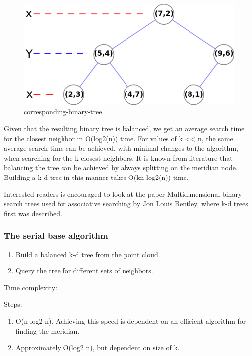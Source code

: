\begin{figure}[ht!]
\centering
\includegraphics[width=120mm]{../gfx/Tree_0001.png}

\caption{corresponding-binary-tree}
\label{fig:tree_0001}
\end{figure}

Given that the resulting binary tree is balanced, we get an average search time for the closest neighbor in O(log2(n)) time. For values of k << n, the same average search time can be achieved, with minimal changes to the algorithm, when searching for the k closest neighbors. It is known from literature that balancing the tree can be achieved by always splitting on the meridian node. Building a k-d tree in this manner takes O(kn log2(n)) time.

Interested readers is encouraged to look at the paper Multidimensional binary search trees used for associative searching by Jon Louis Bentley, where k-d trees first was described.

\subsubsection{The serial base algorithm} %
\label{ssub:the_serial_base_algorithm}

\begin{enumerate}
    \item Build a balanced k-d tree from the point cloud.
    \item Query the tree for different sets of neighbors.
\end{enumerate}

Time complexity:

Steps:
\begin{enumerate}
    \item O(n log2 n). Achieving this speed is dependent on an efficient algorithm for finding the meridian.
    \item Approximately O(log2 n), but dependent on size of k.
\end{enumerate}

